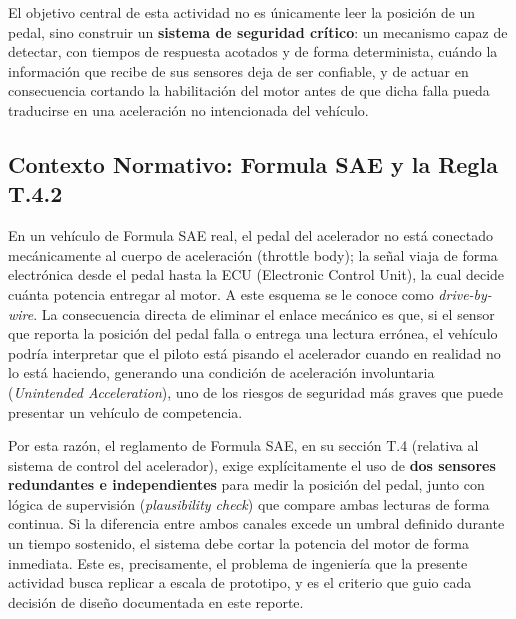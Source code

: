\documentclass[12pt, letterpaper]{article}
\begin{document}
	El objetivo central de esta actividad no es únicamente leer la posición de un pedal, sino construir un \textbf{sistema de seguridad crítico}: un mecanismo capaz de detectar, con tiempos de respuesta acotados y de forma determinista, cuándo la información que recibe de sus sensores deja de ser confiable, y de actuar en consecuencia cortando la habilitación del motor antes de que dicha falla pueda traducirse en una aceleración no intencionada del vehículo.
	
	\subsection{Contexto Normativo: Formula SAE y la Regla T.4.2}
	En un vehículo de Formula SAE real, el pedal del acelerador no está conectado mecánicamente al cuerpo de aceleración (throttle body); la señal viaja de forma electrónica desde el pedal hasta la ECU (Electronic Control Unit), la cual decide cuánta potencia entregar al motor. A este esquema se le conoce como \textit{drive-by-wire}. La consecuencia directa de eliminar el enlace mecánico es que, si el sensor que reporta la posición del pedal falla o entrega una lectura errónea, el vehículo podría interpretar que el piloto está pisando el acelerador cuando en realidad no lo está haciendo, generando una condición de aceleración involuntaria (\textit{Unintended Acceleration}), uno de los riesgos de seguridad más graves que puede presentar un vehículo de competencia.
	
	Por esta razón, el reglamento de Formula SAE, en su sección T.4 (relativa al sistema de control del acelerador), exige explícitamente el uso de \textbf{dos sensores redundantes e independientes} para medir la posición del pedal, junto con lógica de supervisión (\textit{plausibility check}) que compare ambas lecturas de forma continua. Si la diferencia entre ambos canales excede un umbral definido durante un tiempo sostenido, el sistema debe cortar la potencia del motor de forma inmediata. Este es, precisamente, el problema de ingeniería que la presente actividad busca replicar a escala de prototipo, y es el criterio que guio cada decisión de diseño documentada en este reporte.
	
\end{document}
